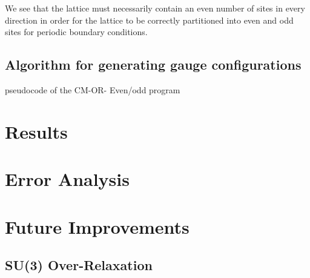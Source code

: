 \documentclass[a4paper,10pt]{article}
\begin{document}
We see that the lattice must necessarily contain an even number of sites in every direction in order for the lattice to be correctly partitioned into even and odd sites for periodic boundary conditions.

\subsection{Algorithm for generating gauge configurations}
pseudocode of the CM-OR- Even/odd program
\section{Results}
\section{Error Analysis}
\section{Future Improvements}
\subsection{SU(3) Over-Relaxation}

\newpage


\end{document}
